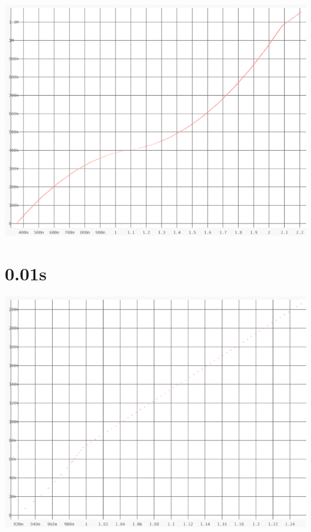 \documentclass{article}
\begin{document}
    \begin{center}
    \includegraphics[angle=90]{set_a_0.1s/set_a_0_1s.png}
    \end{center}
\clearpage

\section{0.01s}
    \noindent\begin{minipage}{.45\textwidth}
    
    \end{minipage}\hfill
    \begin{minipage}{.45\textwidth}
    
    \end{minipage}
    
    \begin{center}
    \includegraphics[angle=90]{set_a_0.01s/set_a_0_01s.png}
    \end{center}
\clearpage


\end{document}
